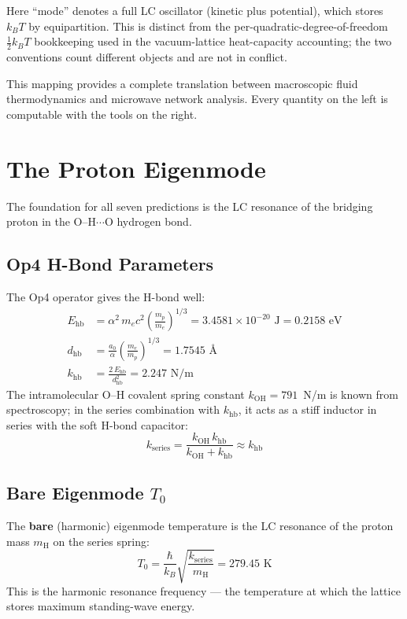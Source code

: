 Here ``mode'' denotes a full LC oscillator (kinetic plus potential), which stores $k_B T$ by equipartition. This is distinct from the per-quadratic-degree-of-freedom $\tfrac{1}{2}k_B T$ bookkeeping used in the vacuum-lattice heat-capacity accounting; the two conventions count different objects and are not in conflict.

This mapping provides a complete translation between macroscopic fluid thermodynamics and microwave network analysis. Every quantity on the left is computable with the tools on the right.


\section{The Proton Eigenmode}
\label{sec:proton_eigenmode}

The foundation for all seven predictions is the LC resonance of the bridging proton in the O--H$\cdots$O hydrogen bond.

\subsection{Op4 H-Bond Parameters}

The Op4 operator gives the H-bond well:
\begin{align}
    E_\mathrm{hb} &= \alpha^2 \, m_e c^2 \left(\frac{m_p}{m_e}\right)^{1/3} = 3.4581 \times 10^{-20} \text{ J} = 0.2158 \text{ eV} \\[4pt]
    d_\mathrm{hb} &= \frac{a_0}{\alpha}\left(\frac{m_e}{m_p}\right)^{1/3} = 1.7545 \text{ \AA} \\[4pt]
    k_\mathrm{hb} &= \frac{2\,E_\mathrm{hb}}{d_\mathrm{hb}^2} = 2.247 \text{ N/m}
\end{align}
The intramolecular O--H covalent spring constant $k_\mathrm{OH} = 791$~N/m is known from spectroscopy; in the series combination with $k_\mathrm{hb}$, it acts as a stiff inductor in series with the soft H-bond capacitor:
\begin{equation}
    k_\mathrm{series} = \frac{k_\mathrm{OH}\, k_\mathrm{hb}}{k_\mathrm{OH} + k_\mathrm{hb}} \approx k_\mathrm{hb}
\end{equation}

\subsection{Bare Eigenmode $T_0$}

The \textbf{bare} (harmonic) eigenmode temperature is the LC resonance of the proton mass $m_\mathrm{H}$ on the series spring:
\begin{equation}
\boxed{
    T_0 = \frac{\hbar}{k_B}\sqrt{\frac{k_\mathrm{series}}{m_\mathrm{H}}} = 279.45 \text{ K}
}
\label{eq:bare_eigenmode}
\end{equation}
This is the harmonic resonance frequency --- the temperature at which the lattice stores maximum standing-wave energy.


